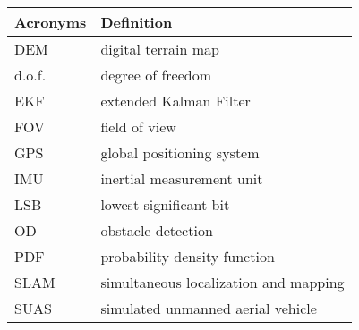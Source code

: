 \begin{center}
\begin{longtable}{ll}
  \hline
  \textbf{Acronyms} & \textbf{Definition} \\
  \hline\hline

DEM     &       digital terrain map\\
d.o.f.  &       degree of freedom \\
EKF     &       extended Kalman Filter \\
FOV	&	field of view	\\
GPS     &       global positioning system \\
IMU     &       inertial measurement unit \\
LSB     &       lowest significant bit  \\
OD      &       obstacle detection \\
PDF     &       probability density function \\
SLAM    &       simultaneous localization and mapping \\
SUAS    &       simulated unmanned aerial vehicle \\

  \hline
\end{longtable}
\end{center}

